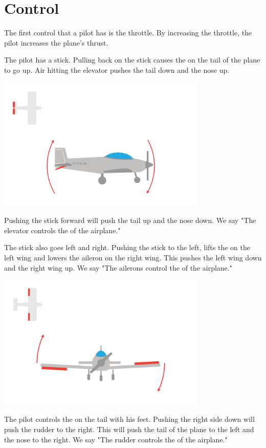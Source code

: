 \section{Control}

The first control that a pilot has is the throttle. By increasing the throttle, the pilot increases the plane's thrust.

The pilot has a stick.  Pulling back on the stick causes the  on the tail of the plane to go up.  Air hitting the elevator pushes the tail down and the nose up. 

\includegraphics[width=0.75\textwidth]{elevator.png}


Pushing the stick forward will push the tail up and the nose down.  We say "The elevator controls the  of the airplane."

The stick also goes left and right. Pushing the stick to the left,  lifts the  on the left wing and lowers the aileron on the right wing.  This pushes the left wing down and 
the right wing up.  We say "The ailerons control the   of the airplane."

\includegraphics[width=0.75\textwidth]{ailerons.png}


The pilot controls the  on the tail with his feet. Pushing the right side down will push the rudder to the right.  This will push the tail of the plane to the left and the 
nose to the right.  We say "The rudder controls the  of the airplane."

